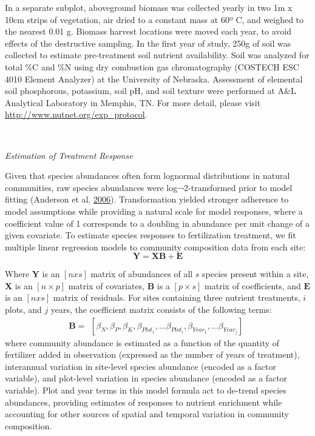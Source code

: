 \documentclass[twoside,12pt,final]{ucthesis-CA2012}
\begin{document}
\begin{ucmainmatter}
In a separate subplot, aboveground biomass was collected yearly in two 1m x 10cm strips of vegetation, air dried to a constant mass at 60º C, and weighed to the nearest 0.01 g. Biomass harvest locations were moved each year, to avoid effects of the destructive sampling. In the first year of study, 250g of soil was collected to estimate pre-treatment soil nutrient availability. Soil was analyzed for total \%C and \%N using dry combustion gas chromatography (COSTECH ESC 4010 Element Analyzer) at the University of Nebraska. Assessment of elemental soil phosphorous, potassium, soil pH, and soil texture were performed at A\&L Analytical Laboratory in Memphis, TN. For more detail, please visit \url{http://www.nutnet.org/exp_protocol}.

~

\emph{Estimation of Treatment Response}

Given that species abundances often form lognormal distributions in natural communities, raw species abundances were log¬2-transformed prior to model fitting (Anderson et al. \protect\hyperlink{ref-Anderson2006}{2006}). Transformation yielded stronger adherence to model assumptions while providing a natural scale for model responses, where a coefficient value of 1 corresponds to a doubling in abundance per unit change of a given covariate.
To estimate species responses to fertilization treatment, we fit multiple linear regression models to community composition data from each site:
\[\mathbf{Y} = \mathbf{XB} + \mathbf{E}\]

Where \(\mathbf{Y}\) is an \([n x s]\) matrix of abundances of all \(s\) species present within a site, \(\mathbf{X}\) is an \([n \times p]\) matrix of covariates, \(\mathbf{B}\) is a \([p \times s]\) matrix of coefficients, and \(\mathbf{E}\) is an \([n x s]\) matrix of residuals. For sites containing three nutrient treatments, \(i\) plots, and \(j\) years, the coefficient matrix consists of the following terms:
\[\mathbf{B} = \begin{matrix}
    [{\beta}_N, {\beta}_P , {\beta}_K, {\beta}_{Plot_1}, ... {\beta}_{Plot_i},
    {\beta}_{Year_1}, ... {\beta}_{Year_j}]
\end{matrix} \]
where community abundance is estimated as a function of the quantity of fertilizer added in observation (expressed as the number of years of treatment), interannual variation in site-level species abundance (encoded as a factor variable), and plot-level variation in species abundance (encoded as a factor variable). Plot and year terms in this model formula act to de-trend species abundances, providing estimates of responses to nutrient enrichment while accounting for other sources of spatial and temporal variation in community composition.


\end{ucmainmatter}
\end{document}
